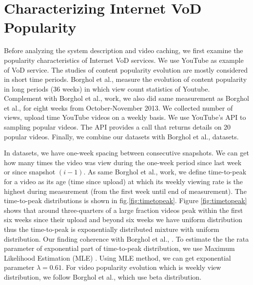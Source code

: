 \documentclass[conference]{IEEEtran}
\begin{document}
\section{Characterizing Internet VoD Popularity}\label{popularity}
Before analyzing the system description and video caching, we first examine the popularity characteristics of Internet VoD services.
We use YouTube as example of VoD service.
The studies of content popularity evolution are mostly considered in short time periods.
Borghol et al., \cite{Borghol:2011:CMP:2039452.2039717} measure the evolution of content popularity in long periods (36 weeks) in which view count statistics of Youtube. 
Complement with Borghol et al., \cite{Borghol:2011:CMP:2039452.2039717} work, we also did same measurement as Borghol et al., \cite{Borghol:2011:CMP:2039452.2039717} for eight weeks from October-November 2013.
We collected number of views, upload time YouTube videos on a weekly basis.
We use YouTube's API to sampling popular videos. 
The API provides a call that returns details on 20 popular videos.
Finally, we combine our datasets with Borghol et al., datasets. 

In datasets, we have one-week spacing between consecutive snapshots.  
We can get how many times the video was view during the one-week period since last week or since snapshot $(i-1)$. 
As same Borghol et al., \cite{Borghol:2011:CMP:2039452.2039717} work, we define time-to-peak for a video as its age (time since upload) at which its weekly viewing rate is the highest during measurement (from the first week until end of measurement).
The time-to-peak distributions is shown in fig.\ref{fig:timetopeak}.
Figure \ref{fig:timetopeak} shows that around three-quarters of a large fraction videos peak within the first six weeks since their upload and beyond six weeks we have uniform distribution thus the time-to-peak is exponentially distributed mixture with uniform distribution. 
Our finding coherence with Borghol et al., \cite{Borghol:2011:CMP:2039452.2039717}.
To estimate the the rata parameter of exponential part of time-to-peak distribution, we use Maximum Likelihood Estimation (MLE) \cite{clauset2009power}.
Using MLE method, we can get exponential parameter $\lambda = 0.61$. 
For video popularity evolution which is weekly view distribution, we follow Borghol et al., \cite{Borghol:2011:CMP:2039452.2039717} which use beta distribution. 
\end{document}
